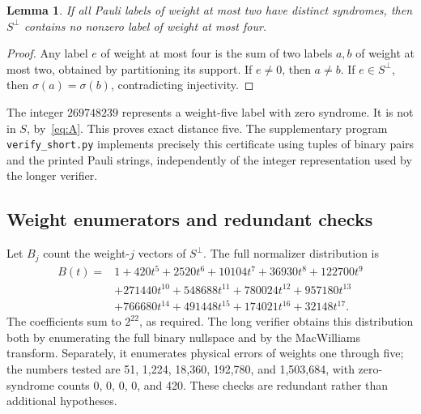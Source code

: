 \documentclass[11pt]{article}
\newtheorem{lemma}[theorem]{Lemma}
\begin{document}
\begin{lemma}\label{lem:syndrome}
If all Pauli labels of weight at most two have distinct syndromes, then $S^\perp$ contains no nonzero label of weight at most four.
\end{lemma}
\begin{proof}
Any label $e$ of weight at most four is the sum of two labels $a,b$ of weight at most two, obtained by partitioning its support. If $e\ne0$, then $a\ne b$. If $e\in S^\perp$, then $\sigma(a)=\sigma(b)$, contradicting injectivity.
\end{proof}
The integer $269748239$ represents a weight-five label with zero syndrome. It is not in $S$, by~\eqref{eq:A}. This proves exact distance five. The supplementary program \texttt{verify\_short.py} implements precisely this certificate using tuples of binary pairs and the printed Pauli strings, independently of the integer representation used by the longer verifier.

\subsection{Weight enumerators and redundant checks}
Let $B_j$ count the weight-$j$ vectors of $S^\perp$. The full normalizer distribution is
\begin{align*}
 B(t)={}&1+420t^5+2520t^6+10104t^7+36930t^8+122700t^9\\
 &+271440t^{10}+548688t^{11}+780024t^{12}+957180t^{13}\\
 &+766680t^{14}+491448t^{15}+174021t^{16}+32148t^{17}.
\end{align*}
The coefficients sum to $2^{22}$, as required. The long verifier obtains this distribution both by enumerating the full binary nullspace and by the MacWilliams transform. Separately, it enumerates physical errors of weights one through five; the numbers tested are 51, 1,224, 18,360, 192,780, and 1,503,684, with zero-syndrome counts 0, 0, 0, 0, and 420. These checks are redundant rather than additional hypotheses.
\end{document}
